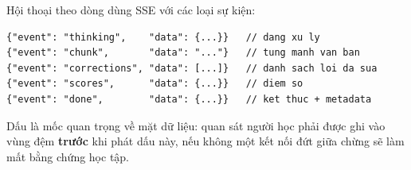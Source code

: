 Hội thoại theo dòng dùng SSE với các loại sự kiện:

\begin{lstlisting}
{"event": "thinking",    "data": {...}}   // dang xu ly
{"event": "chunk",       "data": "..."}   // tung manh van ban
{"event": "corrections", "data": [...]}   // danh sach loi da sua
{"event": "scores",      "data": {...}}   // diem so
{"event": "done",        "data": {...}}   // ket thuc + metadata
\end{lstlisting}

Dấu  là mốc quan trọng về mặt dữ liệu: quan sát người học phải được ghi vào
vùng đệm \textbf{trước} khi phát dấu này, nếu không một kết nối đứt giữa chừng sẽ làm mất
bằng chứng học tập.
